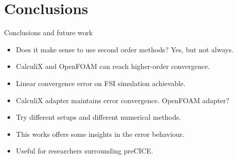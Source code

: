 \documentclass[
  english,            %
  aspectratio=43,    %
]{tumbeamer}
\begin{document}
\section{Conclusions}
\begin{frame}{Conclusions and future work}
    \vspace{30pt}
    \begin{itemize}
        \setlength\itemsep{10pt}
        \item Does it make sense to use second order methods? Yes, but not always.
        \pause
        \item CalculiX and OpenFOAM can reach higher-order convergence.
        \pause
        \item Linear convergence error on FSI simulation achievable.
        \pause
        \item CalculiX adapter maintains error convergence. OpenFOAM adapter?
        \pause
        \item Try different setups and different numerical methods.
        \pause
        \item This works offers some insights in the error behaviour.
        \pause
        \item Useful for researchers surrounding preCICE. 
    \end{itemize}

    
\end{frame}
\end{document}
